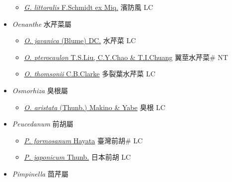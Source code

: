\begin{itemize}
  \begin{itemize}
        \item[] \href{http://www.theplantlist.org/tpl1.1/search?q=Glehnia+littoralis}{\textit{G. littoralis} F.Schmidt ex Miq.}   濱防風 LC
  \end{itemize}
 \item[] \textit{Oenanthe} 水芹菜屬
                    
  \begin{itemize}
        \item[] \href{http://www.theplantlist.org/tpl1.1/search?q=Oenanthe+javanica}{\textit{O. javanica} (Blume) DC.}   水芹菜 LC
        \item[] \href{http://www.theplantlist.org/tpl1.1/search?q=Oenanthe+pterocaulon}{\textit{O. pterocaulon} T.S.Liu, C.Y.Chao \& T.I.Chuang}   翼莖水芹菜\# NT
        \item[] \href{http://www.theplantlist.org/tpl1.1/search?q=Oenanthe+thomsonii}{\textit{O. thomsonii} C.B.Clarke}   多裂葉水芹菜 LC
  \end{itemize}
 \item[] \textit{Osmorhiza} 臭根屬
                    
  \begin{itemize}
        \item[] \href{http://www.theplantlist.org/tpl1.1/search?q=Osmorhiza+aristata}{\textit{O. aristata} (Thunb.) Makino \& Yabe}   臭根 LC
  \end{itemize}
 \item[] \textit{Peucedanum} 前胡屬
                    
  \begin{itemize}
        \item[] \href{http://www.theplantlist.org/tpl1.1/search?q=Peucedanum+formosanum}{\textit{P. formosanum} Hayata}   臺灣前胡\# LC
        \item[] \href{http://www.theplantlist.org/tpl1.1/search?q=Peucedanum+japonicum}{\textit{P. japonicum} Thunb.}   日本前胡 LC
  \end{itemize}
 \item[] \textit{Pimpinella} 茴芹屬
                    

\end{itemize}
